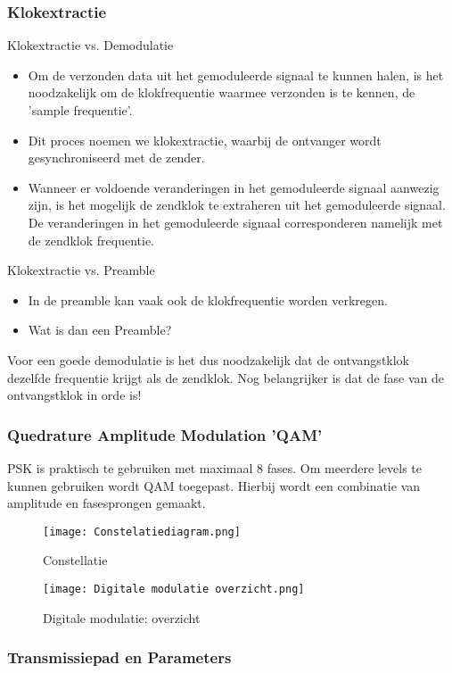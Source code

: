\subsubsection{Klokextractie}

Klokextractie vs. Demodulatie
\begin{itemize}
  \item Om de verzonden data uit het gemoduleerde signaal te kunnen halen, is het noodzakelijk om de klokfrequentie waarmee verzonden is te kennen, de 'sample frequentie'.
  \item Dit proces noemen we klokextractie, waarbij de ontvanger wordt gesynchroniseerd met de zender.
  \item Wanneer er voldoende veranderingen in het gemoduleerde signaal aanwezig zijn, is het mogelijk de zendklok te extraheren uit het gemoduleerde signaal. De veranderingen in het gemoduleerde signaal corresponderen namelijk met de zendklok frequentie.
\end{itemize}

Klokextractie vs. Preamble
\begin{itemize}
  \item In de preamble kan vaak ook de klokfrequentie worden verkregen.
  \item Wat is dan een Preamble?
\end{itemize}

Voor een goede demodulatie is het dus noodzakelijk dat de ontvangstklok dezelfde frequentie krijgt als de zendklok. Nog belangrijker is dat de fase van de ontvangstklok in orde is!


\subsubsection{Quedrature Amplitude Modulation 'QAM'}
PSK is praktisch te gebruiken met maximaal 8 fases. Om meerdere levels te kunnen gebruiken wordt QAM toegepast.
Hierbij wordt een combinatie van amplitude en fasesprongen
gemaakt.

\begin{figure}[H]
\centering
\texttt{[image: Constelatiediagram.png]}
\caption{Constellatie}
\end{figure}

\begin{figure}[H]
\centering
\texttt{[image: Digitale modulatie overzicht.png]}
\caption{Digitale modulatie: overzicht}
\end{figure}


\subsubsection{Transmissiepad en Parameters}

